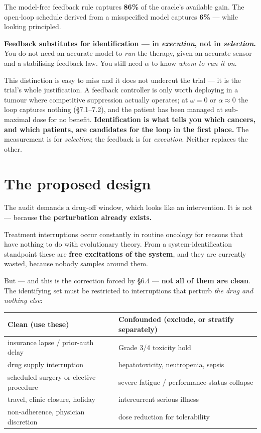 \documentclass[11pt,a4paper]{article}
\begin{document}
The model-free feedback rule captures \textbf{86\%} of the oracle's available gain.
The open-loop schedule derived from a misspecified model captures \textbf{6\%} ---
while looking principled.

\begin{tcolorbox}[keybox]
\textbf{Feedback substitutes for identification --- in \emph{execution}, not in
\emph{selection}.} You do not need an accurate model to \emph{run} the therapy, given
an accurate sensor and a stabilising feedback law. You still need $\alpha$ to know
\emph{whom to run it on}.
\end{tcolorbox}

This distinction is easy to miss and it does not undercut the trial --- it is the
trial's whole justification. A feedback controller is only worth deploying in a tumour
where competitive suppression actually operates; at $\omega = 0$ or $\alpha \approx 0$
the loop captures nothing (\S7.1--7.2), and the patient has been managed at
sub-maximal dose for no benefit. \textbf{Identification is what tells you which
cancers, and which patients, are candidates for the loop in the first place.} The
measurement is for \emph{selection}; the feedback is for \emph{execution}. Neither
replaces the other.

\section{The proposed design}

The audit demands a drug-off window, which looks like an intervention. It is not ---
because \textbf{the perturbation already exists.}

Treatment interruptions occur constantly in routine oncology for reasons that have
nothing to do with evolutionary theory. From a system-identification standpoint these
are \textbf{free excitations of the system}, and they are currently wasted, because
nobody samples around them.

But --- and this is the correction forced by \S6.4 --- \textbf{not all of them are
clean}. The identifying set must be restricted to interruptions that perturb
\emph{the drug and nothing else}:

\begin{center}
\small
\begin{tabular}{ll}
\toprule
\textbf{Clean (use these)} & \textbf{Confounded (exclude, or stratify separately)}\\
\midrule
insurance lapse / prior-auth delay & Grade 3/4 toxicity hold\\
drug supply interruption & hepatotoxicity, neutropenia, sepsis\\
scheduled surgery or elective procedure & severe fatigue / performance-status collapse\\
travel, clinic closure, holiday & intercurrent serious illness\\
non-adherence, physician discretion & dose reduction for tolerability\\
\bottomrule
\end{tabular}
\end{center}
\end{document}
